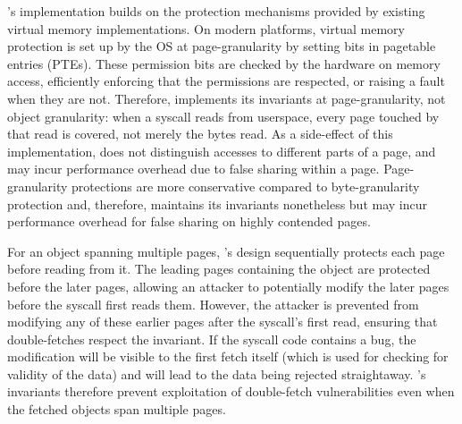 \documentclass[letterpaper,twocolumn,10pt, anonymous]{article}
\begin{document}
\tiktok's implementation builds on the protection mechanisms provided by 
existing virtual memory implementations.
On modern platforms, virtual memory protection is set up by the OS at
page-granularity by setting bits in pagetable entries (PTEs).
These permission bits are checked by the hardware on memory access, 
efficiently enforcing that the permissions are respected, or raising 
a fault when they are not.
Therefore, \tiktok implements its invariants at page-granularity, not object 
granularity: when a syscall reads from userspace, every page touched by that 
read is covered, not merely the bytes read.
As a side-effect of this implementation, \tiktok does not distinguish
accesses to different parts of a page, and may incur performance overhead due
to false sharing within a page. 
Page-granularity protections are more conservative compared to byte-granularity
protection and, therefore, \tiktok maintains its invariants nonetheless but may
incur performance overhead for false sharing on highly contended pages.

For an object spanning multiple pages, \tiktok's design sequentially 
protects each page before reading from it.
The leading pages containing the object are protected before the
later pages, allowing an attacker to potentially modify the later 
pages before the syscall first reads them.
However, the attacker is prevented from modifying any of these earlier pages
after the syscall's first read, ensuring that double-fetches respect
the invariant.
If the syscall code contains a \tocttou bug, the modification will
be visible to the first fetch itself (which is used for checking for 
validity of the data) and will lead to the data being rejected 
straightaway.
\tiktok's invariants therefore prevent exploitation of double-fetch
vulnerabilities even when the fetched objects span multiple pages.
\end{document}
